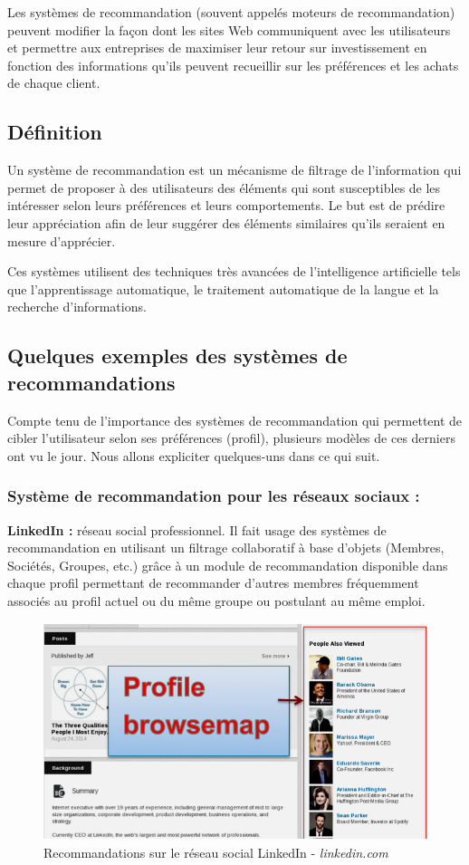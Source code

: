 Les systèmes de recommandation (souvent appelés \textquotedbl moteurs de recommandation\textquotedbl) peuvent modifier la façon dont les sites Web communiquent avec les utilisateurs et permettre aux entreprises de maximiser leur retour sur investissement en fonction des informations qu'ils peuvent recueillir sur les préférences et les achats de chaque client.

\subsection{Définition}
Un système de recommandation est un mécanisme de filtrage de l'information qui permet de proposer à des utilisateurs des éléments qui sont susceptibles de les intéresser selon leurs préférences et leurs comportements. Le but est de prédire leur appréciation afin de leur suggérer des éléments similaires qu'ils seraient en mesure d'apprécier.

Ces systèmes utilisent des techniques très avancées de l'intelligence artificielle tels que l'apprentissage automatique, le traitement automatique de la langue et la recherche d'informations. 

\subsection{Quelques exemples des systèmes de recommandations}
Compte tenu de l'importance des systèmes de recommandation qui permettent de cibler l'utilisateur selon ses préférences (profil), plusieurs modèles de ces derniers ont vu le jour. Nous allons expliciter quelques-uns dans ce qui suit.

\subsubsection{Système de recommandation pour les réseaux sociaux :}
\textbf{LinkedIn :} réseau social professionnel. Il fait usage des systèmes de recommandation en utilisant un filtrage collaboratif à base d'objets (Membres, Sociétés, Groupes, etc.) grâce à un module de recommandation disponible dans chaque profil permettant de recommander d'autres membres fréquemment associés au profil actuel ou du même groupe ou postulant au même emploi.
\begin{figure}[H]
    \centering
    \includegraphics[height=180pt,width=350pt]{img/chapter1/linkedin.png}
    \caption{Recommandations sur le réseau social LinkedIn - \emph{linkedin.com}}
\end{figure}

